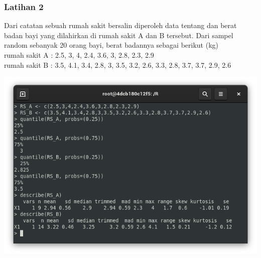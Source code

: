 \documentclass[a4paper,12pt]{article}
\begin{document}
\subsubsection{Latihan 2}
Dari catatan sebuah rumah sakit bersalin diperoleh data tentang dan berat badan bayi yang dilahirkan di rumah sakit A dan B tersebut. Dari sampel random sebanyak 20 orang bayi, berat badannya sebagai berikut (kg)\\ 
rumah sakit A  : 2.5, 3, 4, 2.4, 3.6, 3, 2.8, 2.3,  2.9\\
rumah sakit B : 3.5, 4.1, 3.4, 2.8, 3, 3.5, 3.2, 2.6, 3.3, 2.8, 3.7, 3.7, 2.9, 2.6
\begin{center}
	\includegraphics[scale=.5]{lat2}
\end{center}
\end{document}

